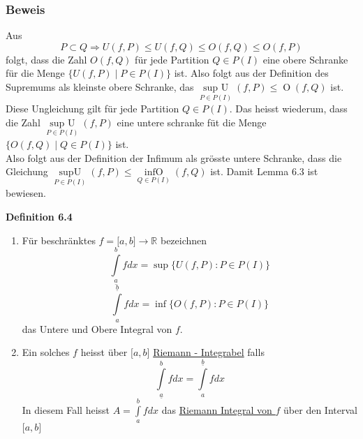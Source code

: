 \subsubsection*{Beweis}
Aus $$P\subset Q \Rightarrow U(f,P) \leq U(f,Q) \leq O(f,Q) \leq O(f,P)$$ folgt, dass die Zahl $O(f,Q)$ für jede Partition $Q\in P(I)$ eine obere Schranke für die Menge $\{ U(f,P)\mid P\in P(I)\}$ ist. Also folgt aus der Definition des Supremums als kleinste obere Schranke, das $\mathop {\sup {\text{ }}U}\limits_{P \in P(I)} (f,P) \le \mathop O(f,Q)$ ist. \\

Diese Ungleichung gilt für jede Partition $Q\in P(I)$. Das heisst wiederum, dass die Zahl $\mathop {\sup {\text{ }}U}\limits_{P \in P(I)} (f,P)$ eine untere schranke füt die Menge $\{ O(f,Q)\mid Q \in P(I)\} $ ist.\\

Also folgt aus der Definition der Infimum als grösste untere Schranke, dass die Gleichung $\mathop {\sup U}\limits_{P \in P(I)} (f,P) \le \mathop {\inf O}\limits_{Q \in P(I)} (f,Q)$ ist. Damit Lemma 6.3 ist bewiesen.
\begin{framed}
\centerline{\textbf{Definition 6.4}}
\begin{enumerate}[1)]
\item Für beschränktes $f=\lbrack a,b \rbrack\rightarrow \mathbb{R}$ bezeichnen 
$$\int\limits_{\underline{a}}^b {fdx = \sup \{ U(f,P):P \in P(I)\} }$$
$$\int\limits_{a}^{\underline{b}} {fdx = \inf \{ O(f,P):P \in P(I)\} }$$
das Untere und Obere Integral von $f$.
\item Ein solches $f$ heisst über $\lbrack a,b\rbrack$ \underline{Riemann - Integrabel} falls $$\int\limits_{\underline{a}}^b {fdx}  = \int\limits_a^{\underline{b}} {fdx} $$ In diesem Fall heisst $A = \int\limits_a^b {fdx} $ das \underline{Riemann Integral von $f$} über den Interval $\lbrack a,b\rbrack$
\end{enumerate}
\end{framed}

